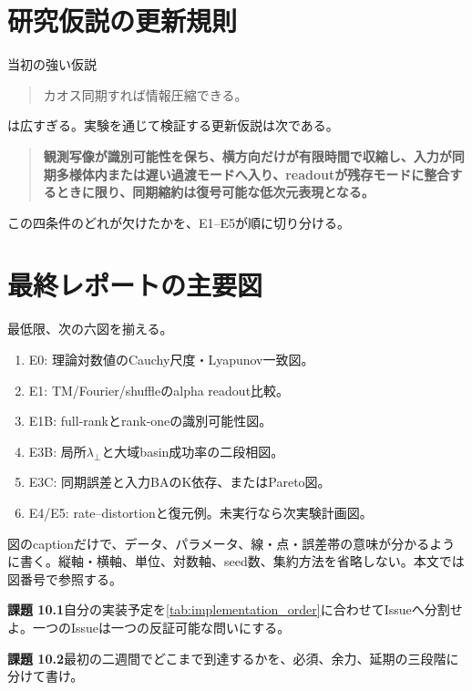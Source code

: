 \documentclass[a4paper,11pt,oneside,openany]{ltjsbook}
\begin{document}
\section{研究仮説の更新規則}

当初の強い仮説
\begin{quote}
カオス同期すれば情報圧縮できる。
\end{quote}
は広すぎる。実験を通じて検証する更新仮説は次である。

\begin{quote}
\textbf{観測写像が識別可能性を保ち、横方向だけが有限時間で収縮し、入力が同期多様体内または遅い過渡モードへ入り、readoutが残存モードに整合するときに限り、同期縮約は復号可能な低次元表現となる。}
\end{quote}

この四条件のどれが欠けたかを、E1--E5が順に切り分ける。

\section{最終レポートの主要図}

最低限、次の六図を揃える。

\begin{enumerate}
  \item E0: 理論対数値のCauchy尺度・Lyapunov一致図。
  \item E1: TM/Fourier/shuffleのalpha readout比較。
  \item E1B: full-rankとrank-oneの識別可能性図。
  \item E3B: 局所\(\lambda_\perp\)と大域basin成功率の二段相図。
  \item E3C: 同期誤差と入力BAのK依存、またはPareto図。
  \item E4/E5: rate--distortionと復元例。未実行なら次実験計画図。
\end{enumerate}

\begin{reportbox}
図のcaptionだけで、データ、パラメータ、線・点・誤差帯の意味が分かるように書く。縦軸・横軸、単位、対数軸、seed数、集約方法を省略しない。本文では図番号で参照する。
\end{reportbox}

\begin{taskbox}
\textbf{課題 10.1}\quad 自分の実装予定を\cref{tab:implementation_order}に合わせてIssueへ分割せよ。一つのIssueは一つの反証可能な問いにする。

\medskip
\textbf{課題 10.2}\quad 最初の二週間でどこまで到達するかを、必須、余力、延期の三段階に分けて書け。
\end{taskbox}
\end{document}
